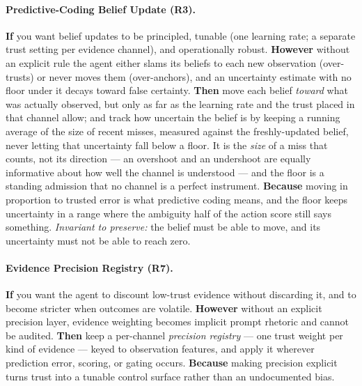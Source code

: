 \paragraph{Predictive-Coding Belief Update (R3).} \textbf{If} you want belief updates to be principled, tunable (one learning rate; a separate trust setting per evidence channel), and operationally robust. \textbf{However} without an explicit rule the agent either slams its beliefs to each new observation (over-trusts) or never moves them (over-anchors), and an uncertainty estimate with no floor under it decays toward false certainty. \textbf{Then} move each belief \emph{toward} what was actually observed, but only as far as the learning rate and the trust placed in that channel allow; and track how uncertain the belief is by keeping a running average of the size of recent misses, measured against the freshly-updated belief, never letting that uncertainty fall below a floor.  It is the \emph{size} of a miss that counts, not its direction --- an overshoot and an undershoot are equally informative about how well the channel is understood --- and the floor is a standing admission that no channel is a perfect instrument. \textbf{Because} moving in proportion to trusted error is what predictive coding means, and the floor keeps uncertainty in a range where the ambiguity half of the action score still says something.  \emph{Invariant to preserve:} the belief must be able to move, and its uncertainty must not be able to reach zero.

\paragraph{Evidence Precision Registry (R7).} \textbf{If} you want the agent to discount low-trust evidence without discarding it, and to become stricter when outcomes are volatile. \textbf{However} without an explicit precision layer, evidence weighting becomes implicit prompt rhetoric and cannot be audited. \textbf{Then} keep a per-channel \emph{precision registry} --- one trust weight per kind of evidence --- keyed to observation features, and apply it wherever prediction error, scoring, or gating occurs. \textbf{Because} making precision explicit turns trust into a tunable control surface rather than an undocumented bias.

